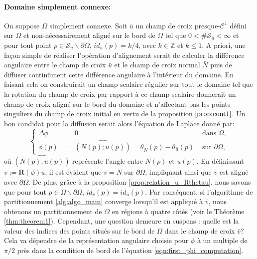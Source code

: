 \paragraph{Domaine simplement connexe:}
On suppose $\Omega$ simplement connexe. Soit $\bar{u}$ un champ de croix presque-$\mathcal{C}^1$ défini sur $\Omega$ et non-nécessairement aligné sur le bord de $\Omega$ tel que $0<\#\mathcal{S}_{\bar{u}}<\infty$ et pour tout point $p\in\mathcal{S}_{\bar{u}}\backslash\partial\Omega$, $id_{\bar{u}}(p)=k/4$, avec $k\in\mathbb{Z}$ et $k\leq 1$. A priori, une façon simple de réaliser l'opération d'alignement serait de calculer la différence angulaire entre le champ de croix $\bar{u}$ et le champ de croix normal $\bar{N}$ puis de diffuser continûment cette différence angulaire à l'intérieur du domaine. En faisant cela on construirait un champ scalaire régulier sur tout le domaine tel que la rotation du champ de croix par rapport à ce champ scalaire donnerait un champ de croix aligné sur le bord du domaine et n'affectant pas les points singuliers du champ de croix initial en vertu de la proposition $\ref{prop:cont1}$. Un bon candidat pour la diffusion serait alors l'équation de Laplace donné par:\begin{equation}
\left\{
\begin{array}{lcll}
\Delta\phi &=& 0 &\mbox{ dans }\Omega,\\[0.5cm]
\phi(p) &=& \widehat{(\bar{N}(p); \bar{u}(p))}=\theta_{\bar{N}}(p)-\theta_{\bar{u}}(p)&\mbox{ sur } \partial\Omega,
\end{array}
\right.
\label{eqn:first_phi_computation}
\end{equation}
où $\widehat{(\bar{N}(p); \bar{u}(p))}$ représente l'angle entre $\bar{N}(p)$ et $\bar{u}(p)$. En définissant $\bar{v}:=\mathbf{R}(\phi)\bar{u}$, il est évident que $\bar{v}=\bar{N}$ sur $\partial\Omega$, impliquant ainsi que $\bar{v}$ est aligné avec $\partial\Omega$. De plus, grâce à la proposition \ref{prop:relation_u_Rthetau}, nous savons que pour tout $p\in\Omega\backslash\partial\Omega$, $id_{\bar{v}}(p)=id_{\bar{u}}(p)$. Par conséquent, si l'algorithme de partitionnement \ref{alg:algo_main} converge lorsqu'il est appliqué à $\bar{v}$, nous obtenons un partitionnement de $\Omega$ en régions à quatre côtés (voir le Théorème \ref{thm:theorem1}). Cependant, une question demeure en suspens : quelle est la valeur des indices des points situés sur le bord de $\Omega$ dans le champ de croix $\bar{v}$? Cela va dépendre de la représentation angulaire choisie pour $\phi$ à un multiple de $\pi/2$ près dans la condition de bord de l'équation \eqref{eqn:first_phi_computation}.

